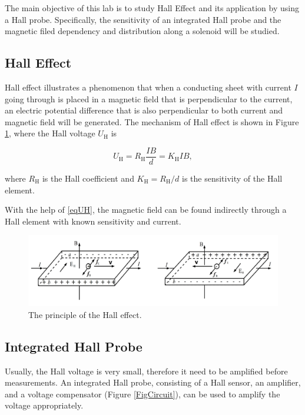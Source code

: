 \documentclass{article}
\begin{document}
The main objective of this lab is to study Hall Effect and its application by using a Hall probe. Specifically, the sensitivity of an integrated Hall probe and the magnetic filed dependency and distribution along a solenoid will be studied.

	\subsection{Hall Effect}
	
Hall effect illustrates a phenomenon that when a conducting sheet with current $I$ going through is placed in a magnetic field that is perpendicular to the current, an electric potential difference that is also perpendicular to both current and magnetic field will be generated. The mechanism of Hall effect is shown in
Figure \ref{FigPrinciple}, where the Hall voltage $U_\text{H}$ is

\begin{equation}\label{eqUH}
U_\text{H} = R_\text{H}\frac{IB}{d} = K_\text{H}IB,
\end{equation}

where $R_\text{H}$ is the Hall coefficient and $K_\text{H} = R_\text{H}/d$ is the sensitivity of the Hall element.

With the help of \eqref{eqUH}, the magnetic field can be found indirectly through a Hall element with known sensitivity and current.
 
\begin{figure}[htbp]
\centering
\includegraphics[scale=0.8]{principle.png}
\caption{The principle of the Hall effect.}\label{FigPrinciple}
\end{figure}


	\subsection{Integrated Hall Probe}

Usually, the Hall voltage is very small, therefore it need to be amplified before  measurements. An integrated Hall probe, consisting of a Hall sensor, an amplifier, and a voltage compensator (Figure \ref{FigCircuit}), can be used to amplify the voltage appropriately. 
\end{document}
